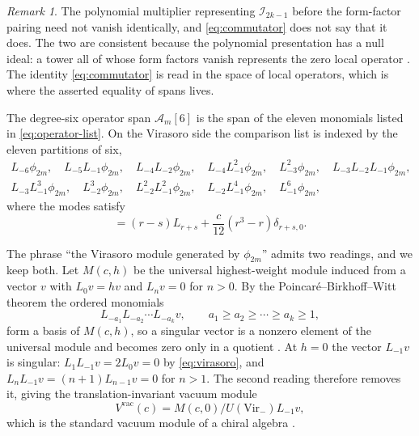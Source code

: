 \documentclass[11pt,reqno]{amsart}
\theoremstyle{plain}
\theoremstyle{definition}
\theoremstyle{remark}
\newtheorem{remark}[theorem]{Remark}
\numberwithin{equation}{section}
\newcommand{\Vir}{\mathrm{Vir}}
\newcommand{\Aop}{\mathcal A}
\newcommand{\Iop}{\mathcal I}
\begin{document}
\begin{remark}
\label{rem:null}
The polynomial multiplier representing $\Iop_{2k-1}$ before the form-factor
pairing need not vanish identically, and \eqref{eq:commutator} does not say
that it does. The two are consistent because the polynomial presentation has a
null ideal: a tower all of whose form factors vanish represents the zero local
operator \cite{Babelon_1997nv}. The identity \eqref{eq:commutator} is read in
the space of local operators, which is where the asserted equality of spans
lives.
\end{remark}

The degree-six operator span $\Aop_m[6]$ is the span of the eleven monomials
listed in \eqref{eq:operator-list}. On the Virasoro side the comparison list
is indexed by the eleven partitions of six,
\begin{equation}
\begin{gathered}
L_{-6}\phi_{2m},\quad L_{-5}L_{-1}\phi_{2m},\quad
L_{-4}L_{-2}\phi_{2m},\quad L_{-4}L_{-1}^2\phi_{2m},\quad
L_{-3}^2\phi_{2m},\quad L_{-3}L_{-2}L_{-1}\phi_{2m},\\
L_{-3}L_{-1}^3\phi_{2m},\quad L_{-2}^3\phi_{2m},\quad
L_{-2}^2L_{-1}^2\phi_{2m},\quad L_{-2}L_{-1}^4\phi_{2m},\quad
L_{-1}^6\phi_{2m},
\end{gathered}
\label{eq:vir-list}
\end{equation}
where the modes satisfy
\begin{equation}
  [L_r,L_s]=(r-s)L_{r+s}+\frac{c}{12}(r^3-r)\delta_{r+s,0}.
  \label{eq:virasoro}
\end{equation}

The phrase ``the Virasoro module generated by $\phi_{2m}$'' admits two
readings, and we keep both. Let $M(c,h)$ be the universal highest-weight
module induced from a vector $v$ with $L_0v=hv$ and $L_nv=0$ for $n>0$. By
the Poincar\'e--Birkhoff--Witt theorem the ordered monomials
\begin{equation}
  L_{-a_1}L_{-a_2}\cdots L_{-a_k}v,
  \qquad a_1\ge a_2\ge\cdots\ge a_k\ge1,
  \label{eq:pbw}
\end{equation}
form a basis of $M(c,h)$, so a singular vector is a nonzero element of the
universal module and becomes zero only in a quotient
\cite{Feigin_1984vm,Kac_cf}. At $h=0$ the vector $L_{-1}v$ is singular:
$L_1L_{-1}v=2L_0v=0$ by \eqref{eq:virasoro}, and $L_nL_{-1}v=(n+1)L_{n-1}v=0$
for $n>1$. The second reading therefore removes it, giving the
translation-invariant vacuum module
\begin{equation}
  V^{\mathrm{vac}}(c)=M(c,0)\big/U(\Vir_-)L_{-1}v,
  \label{eq:vacuum-quotient}
\end{equation}
which is the standard vacuum module of a chiral algebra
\cite{Rocha-Caridi_1985vv}.
\end{document}
